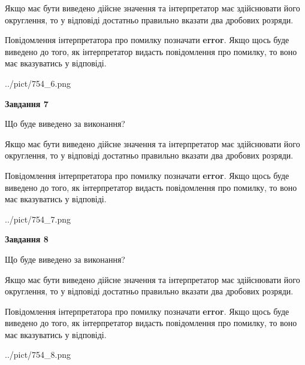 \documentclass[12pt, ukrainian]{article}
\begin{document}
{\begin {Large}
Якщо має бути виведено дійсне значення та інтерпретатор має здійснювати його округлення, 
то у відповіді достатньо правильно вказати два дробових розряди.

Повідомлення інтерпретатора про помилку позначати \textbf{error}.
Якщо щось буде виведено до того, як інтерпретатор видасть повідомлення про помилку, 
то воно має вказуватись у відповіді. \par

\begin{center}
	{../pict/754_6.png}
\end{center}
\newpage

{\begin {center}\textbf{Завдання 7}\end {center}}\par
Що буде виведено за виконання? \par

Якщо має бути виведено дійсне значення та інтерпретатор має здійснювати його округлення, 
то у відповіді достатньо правильно вказати два дробових розряди.

Повідомлення інтерпретатора про помилку позначати \textbf{error}.
Якщо щось буде виведено до того, як інтерпретатор видасть повідомлення про помилку, 
то воно має вказуватись у відповіді. \par

\begin{center}
	{../pict/754_7.png}
\end{center}
\newpage

{\begin {center}\textbf{Завдання 8}\end {center}}\par
Що буде виведено за виконання? \par

Якщо має бути виведено дійсне значення та інтерпретатор має здійснювати його округлення, 
то у відповіді достатньо правильно вказати два дробових розряди.

Повідомлення інтерпретатора про помилку позначати \textbf{error}.
Якщо щось буде виведено до того, як інтерпретатор видасть повідомлення про помилку, 
то воно має вказуватись у відповіді. \par

\begin{center}
	{../pict/754_8.png}
\end{center}
\newpage


\end{Large}}
\end{document}
